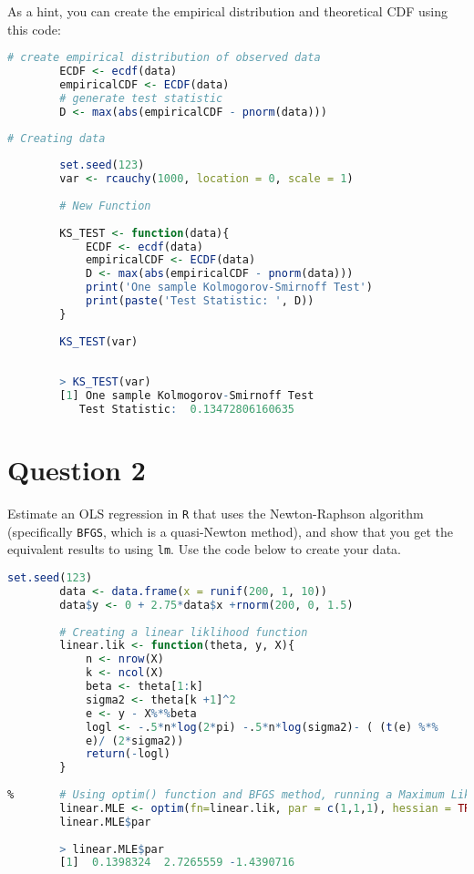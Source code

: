 \documentclass[12pt,letterpaper]{article}
\begin{document}
	
	\noindent As a hint, you can create the empirical distribution and theoretical CDF using this code:
	
	\begin{lstlisting}[language=R]
		# create empirical distribution of observed data
		ECDF <- ecdf(data)
		empiricalCDF <- ECDF(data)
		# generate test statistic
		D <- max(abs(empiricalCDF - pnorm(data))) \end{lstlisting}
	

	\begin{lstlisting}[language=R]
		# Creating data
		
		set.seed(123)
		var <- rcauchy(1000, location = 0, scale = 1)
		
		# New Function
		
		KS_TEST <- function(data){
			ECDF <- ecdf(data)
			empiricalCDF <- ECDF(data)
			D <- max(abs(empiricalCDF - pnorm(data)))
			print('One sample Kolmogorov-Smirnoff Test')
			print(paste('Test Statistic: ', D))
		}
		
		KS_TEST(var)
		
		
		> KS_TEST(var)
		[1] One sample Kolmogorov-Smirnoff Test
	       Test Statistic:  0.13472806160635
	 \end{lstlisting}
	
	\section*{Question 2}
	\noindent Estimate an OLS regression in \texttt{R} that uses the Newton-Raphson algorithm (specifically \texttt{BFGS}, which is a quasi-Newton method), and show that you get the equivalent results to using \texttt{lm}. Use the code below to create your data.
 
  
  	\begin{lstlisting}[language=R]
  		set.seed(123)
  		data <- data.frame(x = runif(200, 1, 10))
  		data$y <- 0 + 2.75*data$x +rnorm(200, 0, 1.5)
  		
  		# Creating a linear liklihood function
  		linear.lik <- function(theta, y, X){
  			n <- nrow(X)
  			k <- ncol(X)
  			beta <- theta[1:k]
  			sigma2 <- theta[k +1]^2
  			e <- y - X%*%beta
  			logl <- -.5*n*log(2*pi) -.5*n*log(sigma2)- ( (t(e) %*%
  			e)/ (2*sigma2))
  			return(-logl)
  		}
  		
%  		# Using optim() function and BFGS method, running a Maximum Liklihood Estimation
  		linear.MLE <- optim(fn=linear.lik, par = c(1,1,1), hessian = TRUE, y= data$y, X=cbind(1, data$x), method = "BFGS")
  		linear.MLE$par
  		
  		> linear.MLE$par
  		[1]  0.1398324  2.7265559 -1.4390716
  		 \end{lstlisting}
  	 
\end{document}

